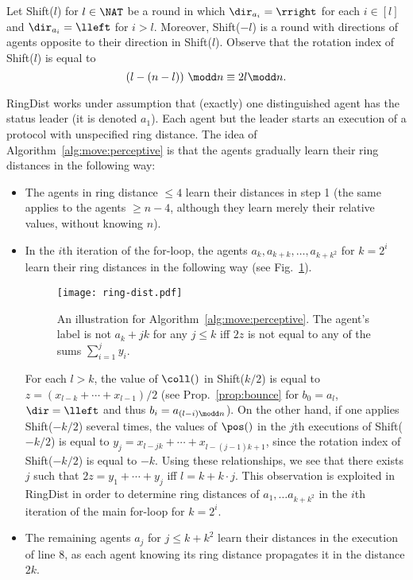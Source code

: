 Let Shift($l$) for $l\in\NAT$ be a round in which
$\dir_{a_{i}}=\rright$ for each $i\in[l]$ and
$\dir_{a_{i}}=\lleft$ for $i>l$.
Moreover, Shift($-l$) is a round with directions of agents
opposite to their direction in Shift($l$).
Observe that the rotation index of Shift($l$) is equal to 
$$(l-(n-l))\ \modd n\equiv 2l\modd n.$$

RingDist works under assumption that (exactly) one distinguished
agent has the status leader (it is denoted $a_1$).
Each agent but the leader starts an execution of a protocol with unspecified
ring distance. The idea of Algorithm~\ref{alg:move:perceptive} is that the
agents gradually learn their ring distances in the following way:
\begin{itemize}
\item
The agents in ring distance $\leq 4$ learn their distances in step 1
(the same applies to the agents $\geq n-4$, although they learn merely their
relative values, without knowing $n$).
\item
In the $i$th iteration of the for-loop, the agents $a_k,a_{k+k},\ldots,a_{k+k^2}$ for $k=2^i$
learn their ring distances in the following way (see Fig.~\ref{fig:ring:dist}).
\begin{figure}[h]
\begin{center}
  \texttt{[image: ring-dist.pdf]}
  \caption{An illustration for Algorithm~\ref{alg:move:perceptive}. The agent's
	label is not $a_k+jk$ for any $j\leq k$ iff $2z$ is not equal to any of the sums
	$\sum_{i=1}^j y_i$.}
\label{fig:ring:dist}
\end{center}
\end{figure}
For each $l>k$, the value of $\coll()$ in Shift($k/2$) is equal to $z=(x_{l-k}+\cdots+x_{l-1})/2$
(see Prop.~\ref{prop:bounce} for $b_0=a_l$, $\dir=\lleft$ and thus
$b_i=a_{(l-i)\modd n}$).
On the other hand, if one applies Shift($-k/2$) several times,
the values of $\pos()$ in the $j$th executions of Shift($-k/2$) is equal to
$y_j=x_{l-jk}+\cdots+x_{l-(j-1)k+1}$, since the rotation index of Shift($-k/2$) is equal to $-k$.
Using these relationships, we see that there exists $j$ such that $2z=y_1+\cdots+y_j$
iff $l=k+k\cdot j$.
This observation is exploited in RingDist in order to determine ring distances of $a_1,\ldots a_{k+k^2}$
in the $i$th iteration of the main for-loop for $k=2^i$.

\item
The remaining agents $a_j$ for $j\leq k+k^2$ learn their distances
in the execution of line 8, as each agent knowing
its ring distance propagates it in the distance $2k$.
\end{itemize}
